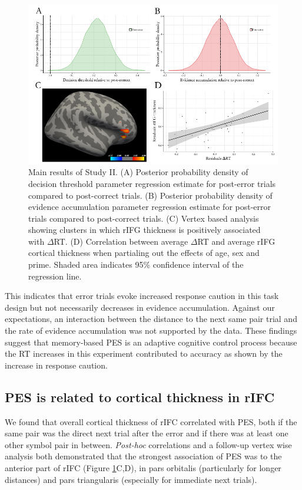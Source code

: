 \documentclass[12pt,openany]{book}
\theoremstyle{definition}
\theoremstyle{definition}
\theoremstyle{definition}
\theoremstyle{remark}
\begin{document}
\begin{figure}
\centering
  \includegraphics{./figures/results_study2.pdf}
  \caption{Main results of Study II. (A) Posterior probability density of decision threshold parameter regression estimate for post-error trials compared to post-correct trials. (B) Posterior probability density of evidence accumulation parameter regression estimate for post-error trials compared to post-correct trials. (C) Vertex based analysis showing clusters in which rIFG thickness is positively associated with $\Delta$RT. (D) Correlation between average $\Delta$RT and average rIFG cortical thickness when partialing out the effects of age, sex and prime. Shaded area indicates 95\% confidence interval of the regression line.\label{fig_results_study2}}
\end{figure}

This indicates that error trials evoke increased response caution in
this task design but not necessarily decreases in evidence accumulation.
Against our expectations, an interaction between the distance to the
next same pair trial and the rate of evidence accumulation was not
supported by the data. These findings suggest that memory-based PES is
an adaptive cognitive control process because the RT increases in this
experiment contributed to accuracy as shown by the increase in response
caution.

\subsection{PES is related to cortical thickness in
rIFC}\label{pes-is-related-to-cortical-thickness-in-rifc}

We found that overall cortical thickness of rIFC correlated with PES,
both if the same pair was the direct next trial after the error and if
there was at least one other symbol pair in between. \emph{Post-hoc}
correlations and a follow-up vertex wise analysis both demonstrated that
the strongest association of PES was to the anterior part of rIFC
(Figure \ref{fig_results_study2}C,D), in pars orbitalis (particularly
for longer distances) and pars triangularis (especially for immediate
next trials).
\end{document}
